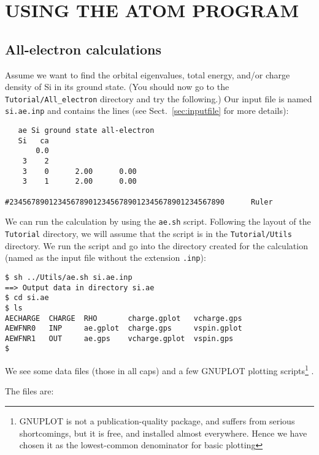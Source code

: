 \documentclass[11pt]{article}
\begin{document}
\section{USING THE ATOM PROGRAM}


\subsection{All-electron calculations}

Assume we want to find the orbital eigenvalues, total energy, and/or
charge density of Si in its ground state. (You should now go to the
{\tt Tutorial/All\_electron} directory and try the following.)  Our
input file is named {\tt si.ae.inp} and contains the lines (see 
Sect.~\ref{sec:inputfile} for more details):

\begin{verbatim}
   ae Si ground state all-electron
   Si   ca
       0.0
    3    2
    3    0      2.00      0.00
    3    1      2.00      0.00

#2345678901234567890123456789012345678901234567890      Ruler
\end{verbatim}

We can run the calculation by using the {\tt ae.sh} script. Following
the layout of the {\tt Tutorial} directory, we will assume that the
script is in the {\tt Tutorial/Utils} directory. We run the
script and go into the directory created for the calculation (named
as the input file without the extension {\tt .inp}):

\begin{verbatim}
$ sh ../Utils/ae.sh si.ae.inp
==> Output data in directory si.ae
$ cd si.ae
$ ls
AECHARGE  CHARGE  RHO       charge.gplot   vcharge.gps
AEWFNR0   INP     ae.gplot  charge.gps     vspin.gplot
AEWFNR1   OUT     ae.gps    vcharge.gplot  vspin.gps
$
\end{verbatim}

We see some data files (those in all caps) and a few GNUPLOT plotting
scripts\footnote{GNUPLOT is not a publication-quality package, and
suffers from serious shortcomings, but it is free, and installed
almost everywhere. Hence we have chosen it as the lowest-common
denominator for basic plotting} . 

The files are:
\end{document}
